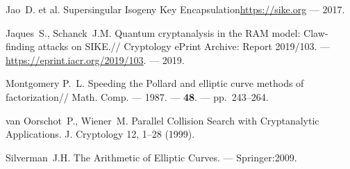 \documentclass[a4paper,12pt]{article}
\theoremstyle{definition}
\begin{document}
\begin{thebibliography}{1}
  

  Jao~D. et al. \newblock Supersingular Isogeny Key Encapsulation\newblock \url{https://sike.org} --- 2017.


Jaques~S.,  Schanck~J.M.
\newblock Quantum cryptanalysis in the RAM model: Claw-finding attacks on SIKE.//
 Cryptology ePrint Archive: Report 2019/103. ---  \newblock \url{https://eprint.iacr.org/2019/103}. --- 2019.

 
 

 




Montgomery P.~L.
\newblock
\newblock Speeding the {P}ollard and elliptic curve methods of factorization//
  Math. Comp.
\newblock --- 1987. --- {\bf 48}. --- pp.~243--264.


 van Oorschot~P., Wiener~M. Parallel Collision Search with Cryptanalytic Applications. J. Cryptology 12, 1–28 (1999).



Silverman~J.H.
\newblock The Arithmetic of Elliptic Curves. 
--- Springer:2009.



\end{thebibliography}
\end{document}
